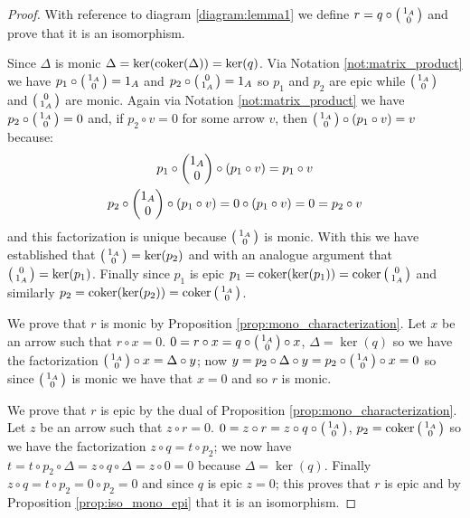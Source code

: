 \begin{proof}
  With reference to diagram \ref{diagram:lemma1} we define \(r = q\circ\left(\begin{smallmatrix}1_A\\ 0\end{smallmatrix}\right)\) and prove that it is an isomorphism.

  Since \(\Delta\) is monic \(\Delta = \ker(\operatorname{coker}(\Delta)) = \ker(q)\). Via Notation \ref{not:matrix_product} we have \(p_1\circ\left(\begin{smallmatrix}1_A\\ 0\end{smallmatrix}\right) = 1_A\) and \(p_2\circ\left(\begin{smallmatrix}0\\ 1_A\end{smallmatrix}\right) = 1_A\) so \(p_1\) and \(p_2\) are epic while \(\left(\begin{smallmatrix}1_A\\ 0\end{smallmatrix}\right)\) and \(\left(\begin{smallmatrix}0\\ 1_A\end{smallmatrix}\right)\) are monic. Again via Notation \ref{not:matrix_product} we have \(p_2\circ\left(\begin{smallmatrix}1_A\\ 0\end{smallmatrix}\right) = 0\) and, if \(p_2\circ v = 0\) for some arrow \(v\), then \(\left(\begin{smallmatrix}1_A\\ 0\end{smallmatrix}\right)\circ(p_1\circ v) = v\) because:
  \begin{gather*}
    p_1\circ\begin{pmatrix}1_A\\ 0\end{pmatrix}\circ(p_1\circ v) = p_1\circ v\\
    p_2\circ\begin{pmatrix}1_A\\ 0\end{pmatrix}\circ(p_1\circ v) = 0\circ(p_1\circ v) = 0 = p_2\circ v
  \end{gather*}
  and this factorization is unique because \(\left(\begin{smallmatrix}1_A\\ 0\end{smallmatrix}\right)\) is monic. With this we have established that \(\left(\begin{smallmatrix}1_A\\ 0\end{smallmatrix}\right) = \ker(p_2)\) and with an analogue argument that \(\left(\begin{smallmatrix}0\\ 1_A\end{smallmatrix}\right) = \ker(p_1)\). Finally since \(p_1\) is epic \(p_1 = \operatorname{coker}(\ker(p_1)) = \operatorname{coker}\left(\begin{smallmatrix}0\\ 1_A\end{smallmatrix}\right)\) and similarly \(p_2 = \operatorname{coker}(\ker(p_2)) = \operatorname{coker}\left(\begin{smallmatrix}1_A\\ 0\end{smallmatrix}\right)\).

  We prove that \(r\) is monic by Proposition \ref{prop:mono_characterization}. Let \(x\) be an arrow such that \(r\circ x = 0\). \(0 = r\circ x = q\circ\left(\begin{smallmatrix}1_A\\ 0\end{smallmatrix}\right)\circ x\), \(\Delta = \ker(q)\) so we have the factorization \(\left(\begin{smallmatrix}1_A\\ 0\end{smallmatrix}\right)\circ x =\Delta\circ y\); now \(y = p_2\circ\Delta\circ y = p_2\circ\left(\begin{smallmatrix}1_A\\ 0\end{smallmatrix}\right)\circ x = 0\) so since \(\left(\begin{smallmatrix}1_A\\ 0\end{smallmatrix}\right)\) is monic we have that \(x = 0\) and so \(r\) is monic.

  We prove that \(r\) is epic by the dual of Proposition \ref{prop:mono_characterization}. Let \(z\) be an arrow such that \(z\circ r = 0\). \(0 = z\circ r = z\circ q\circ\left(\begin{smallmatrix}1_A\\ 0\end{smallmatrix}\right)\), \(p_2=\operatorname{coker}\left(\begin{smallmatrix}1_A\\ 0\end{smallmatrix}\right)\) so we have the factorization \(z\circ q = t\circ p_2\); we now have \(t = t\circ p_2\circ\Delta = z\circ q\circ\Delta = z\circ 0 = 0\) because \(\Delta = \ker(q)\). Finally \(z\circ q = t\circ p_2 = 0\circ p_2 = 0\) and since \(q\) is epic \(z = 0\); this proves that \(r\) is epic and by Proposition \ref{prop:iso_mono_epi} that it is an isomorphism.
\end{proof}

